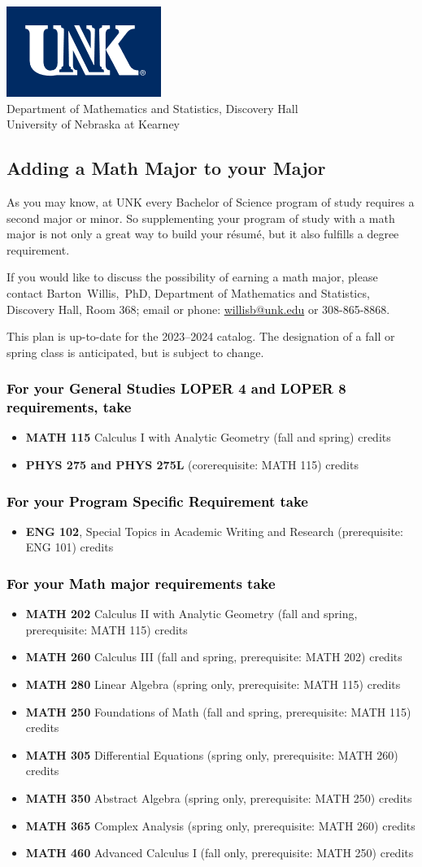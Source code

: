 \documentclass[11pt]{article}
\makeatletter
\newcommand{\calcone}{\textbf{MATH 115} Calculus I with Analytic Geometry (fall and spring) \dotfill 5 credits}
\newcommand{\calconeshort}{MATH 115}
\newcommand{\calctwo}{\textbf{MATH 202} Calculus II with Analytic Geometry (fall and spring, prerequisite: MATH 115) \dotfill 5 credits }
\newcommand{\foundations}{\textbf{MATH 250} Foundations of Math (fall and spring, prerequisite: MATH 115)  \dotfill 3 credits}
\newcommand{\calcthree}{\textbf{MATH 260} Calculus III  (fall and spring, prerequisite: MATH 202) \dotfill 5 credits}
\newcommand{\linear}{\textbf{MATH 280} Linear Algebra (spring only, prerequisite: MATH 115) \dotfill 3 credits}
\newcommand{\diffeq}{\textbf{MATH 305}	Differential Equations (spring only, prerequisite: MATH 260) \dotfill 	3 credits}
\newcommand{\abstractalgebra}{\textbf{MATH 350}	Abstract Algebra (spring only, prerequisite: MATH 250) \dotfill 	3 credits}
\newcommand{\complex}{\textbf{MATH 365}	Complex Analysis (spring only,  prerequisite: MATH 260) \dotfill 3 credits}
\newcommand{\advancedcalc}{\textbf{MATH 460}	Advanced Calculus I  (fall only,   prerequisite: MATH 250) \dotfill 3 credits}
\newcommand{\physics}{\textbf{PHYS 275 and PHYS 275L}  (corerequisite: \calconeshort) \dotfill 5 credits}
\newcommand{\contactbw}{\mbox{Barton Willis, PhD}, Department of Mathematics and Statistics,  Discovery Hall, Room 368;
email or phone: \href{mailto:willisb@unk.edu}{willisb@unk.edu} or 308-865-8868.}
\newcommand{\forinfo}[2]{If you would like to discuss the possibility of earning a math {#1}, please contact \contactbw}
\newcommand{\catalog}{2023--2024 }
\newcommand{\LOPER}{LOPER\xspace}
\newcommand{\uptodate}{This plan is up-to-date for  the \catalog catalog. The designation of a fall or spring class is 
anticipated, but  is subject to change.}
\newcommand{\myheading}{
\begin{flushleft}
\includegraphics[scale=0.35]{unk-logo}\\
\setcounter{footnote}{0}
\vspace{0.25in}
 \textcolor{unkblue}{Department of Mathematics and Statistics, Discovery Hall} \\
  \textcolor{unkblue}{University of Nebraska at Kearney}
\end{flushleft}}
\makeatother
\begin{document}
\newpage

\myheading


\subsection*{\textbf{\textcolor{unkblue}{Adding a Math Major to your Major}}}

As you may know, at UNK every Bachelor of Science program of study requires a second
major or minor. So supplementing your  program of study with a math major is not only a great
way to build your r\'esum\'e, but it also fulfills a degree requirement.


\forinfo{major}{program of study}

\uptodate

\subsubsection*{\textcolor{black}{For your General Studies \LOPER 4  and  \LOPER 8 requirements, take}}
\begin{itemize}
\item \calcone
   \item \physics 
\end{itemize}
\vspace{-0.1in}
\subsubsection*{\textcolor{black}{For your Program Specific Requirement take}}
\begin{itemize}
   \item \textbf{ENG 102}, Special Topics in Academic Writing and Research (prerequisite: ENG 101)   credits
\end{itemize}
\vspace{-0.1in}
\subsubsection*{\textcolor{black}{For your Math major requirements take}}
\begin{itemize}
  \item \calctwo
  \item \calcthree
  \item \linear
\item \foundations
\item \diffeq
\item \abstractalgebra
\item \complex
\item \advancedcalc
\end{itemize}
\vspace{-0.1in}
\end{document}
